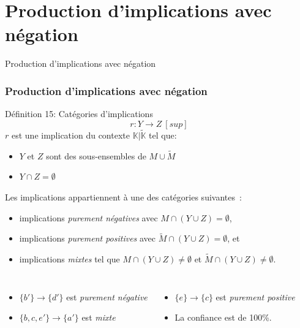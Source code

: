 \documentclass[french]{beamer}
\def\KKc{\mathbb{K}|\tilde{\mathbb{K}}}
\begin{document}
\section[Négation]{Production d'implications avec négation}
\begin{frame}
\huge{\centerline{Production d'implications avec négation}}
\end{frame}
\begin{frame}
\frametitle{Production d'implications avec négation}
\begin{block}{Définition 15: Catégories d'implications}
$$r: Y \rightarrow Z \ [sup]$$
$r$ est une implication du contexte $\KKc$ tel que:
\begin{itemize}
\item $Y$ et $Z$ sont des sous-ensembles de $M \cup \tilde{M}$
\item $Y \cap Z = \emptyset$
\end{itemize}
Les implications appartiennent à une des catégories suivantes~: 
\begin{itemize}
\item implications \emph{purement négatives} avec $M \cap (Y \cup Z) = \emptyset$,
\item implications \emph{purement positives} avec $\tilde{M} \cap (Y \cup Z) = \emptyset$, et 
\item implications \emph{mixtes} tel que $M \cap (Y \cup Z) \ne \emptyset$ et $\tilde{M} \cap (Y \cup Z) \ne \emptyset$.
\end{itemize}
\end{block}
\begin{columns}[c] %
\begin{itemize}
  \item $\{b'\} \rightarrow \{d'\}$ est \emph{purement négative}
  \item $\{b,c,e'\} \rightarrow \{a'\}$ est \emph{mixte}
\end{itemize}
\begin{itemize}
  \item $\{e\} \rightarrow \{c\}$ est \emph{purement positive}
  \item La confiance est de 100\%.
\end{itemize}
\end{columns}
\end{frame}
\end{document}
